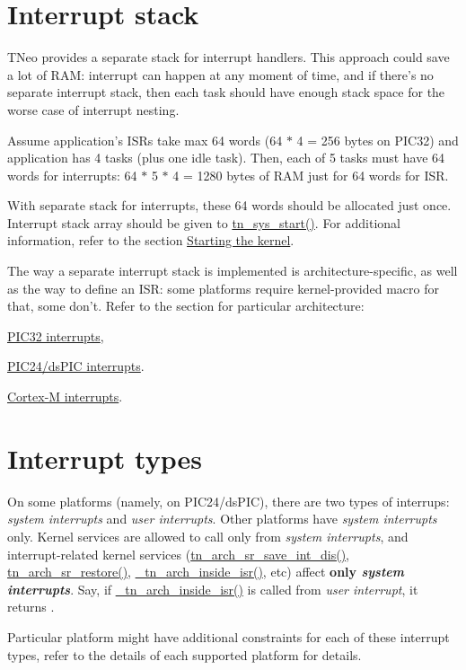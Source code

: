 \hypertarget{interrupts_interrupt_stack}{}\section{Interrupt stack}\label{interrupts_interrupt_stack}
T\+Neo provides a separate stack for interrupt handlers. This approach could save a lot of R\+A\+M\+: interrupt can happen at any moment of time, and if there's no separate interrupt stack, then each task should have enough stack space for the worse case of interrupt nesting.

Assume application's I\+S\+Rs take max 64 words (64 $\ast$ 4 = 256 bytes on P\+I\+C32) and application has 4 tasks (plus one idle task). Then, each of 5 tasks must have 64 words for interrupts\+: 64 $\ast$ 5 $\ast$ 4 = 1280 bytes of R\+A\+M just for 64 words for I\+S\+R.

With separate stack for interrupts, these 64 words should be allocated just once. Interrupt stack array should be given to {\ttfamily \hyperlink{tn__sys_8h_a62ab25d9d8ca01c02d368968f19e49bf}{tn\+\_\+sys\+\_\+start()}}. For additional information, refer to the section \hyperlink{quick_guide_starting_the_kernel}{Starting the kernel}.

The way a separate interrupt stack is implemented is architecture-\/specific, as well as the way to define an I\+S\+R\+: some platforms require kernel-\/provided macro for that, some don't. Refer to the section for particular architecture\+:


\begin{DoxyItemize}
\item \hyperlink{arch_specific_pic32_interrupts}{P\+I\+C32 interrupts},
\item \hyperlink{arch_specific_pic24_interrupts}{P\+I\+C24/ds\+P\+I\+C interrupts}.
\item \hyperlink{arch_specific_cortex_m_interrupts}{Cortex-\/\+M interrupts}.
\end{DoxyItemize}\hypertarget{interrupts_interrupt_types}{}\section{Interrupt types}\label{interrupts_interrupt_types}
On some platforms (namely, on P\+I\+C24/ds\+P\+I\+C), there are two types of interrups\+: {\itshape system interrupts} and {\itshape user interrupts}. Other platforms have {\itshape system interrupts} only. Kernel services are allowed to call only from {\itshape system interrupts}, and interrupt-\/related kernel services ({\ttfamily \hyperlink{tn__arch_8h_a7078b776570ca67a51b89d2746bdb6f7}{tn\+\_\+arch\+\_\+sr\+\_\+save\+\_\+int\+\_\+dis()}}, {\ttfamily \hyperlink{tn__arch_8h_aa755327bd8c4e4303c87c2b0cbed0f17}{tn\+\_\+arch\+\_\+sr\+\_\+restore()}}, {\ttfamily \hyperlink{tn__arch_8h_a34ffbae8b6837f7f3014bca9991e2272}{\+\_\+tn\+\_\+arch\+\_\+inside\+\_\+isr()}}, etc) affect {\bfseries only {\itshape system interrupts}}. Say, if {\ttfamily \hyperlink{tn__arch_8h_a34ffbae8b6837f7f3014bca9991e2272}{\+\_\+tn\+\_\+arch\+\_\+inside\+\_\+isr()}} is called from {\itshape user interrupt}, it returns {}.

Particular platform might have additional constraints for each of these interrupt types, refer to the details of each supported platform for details. 